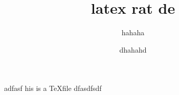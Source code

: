 \documentclass{article}
\title{latex rat de}
\author{hahaha}
\date{dhahahd}
\begin{document}
\maketitle
    adfasf his is a \TeX file dfasdfsdf 
\end{document}
